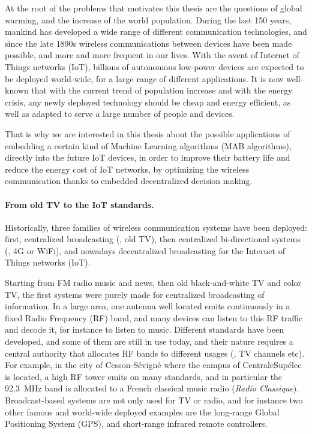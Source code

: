 %
At the root of the problems that motivates this thesis are the questions of global warming, and the increase of the world population.
During the last 150 years, mankind has developed a wide range of different communication technologies, and since the late $1890$s wireless communications between devices have been made possible, and more and more frequent in our lives.
With the avent of Internet of Things networks (IoT), billions of autonomous low-power devices are expected to be deployed world-wide, for a large range of different applications.
It is now well-known that with the current trend of population increase and with the energy crisis, any newly deployed technology should be cheap and energy efficient,
as well as adapted to serve a large number of people and devices.

That is why we are interested in this thesis about the possible applications of embedding a certain kind of Machine Learning algorithms (MAB algorithms),
directly into the future IoT devices, in order to improve their battery life and reduce the energy cost of IoT networks, by optimizing the wireless communication thanks to embedded decentralized decision making.


\paragraph{From old TV to the IoT standards.}
%
Historically, three families of wireless communication systems have been deployed: first, centralized broadcasting (\eg, old TV), then centralized bi-directional systems (\eg, 4G or WiFi), and nowadays decentralized broadcasting for the Internet of Things networks (IoT).

Starting from FM radio music and news, then old black-and-white TV and color TV, the first systems were purely made for centralized broadcasting of information. In a large area, one antenna well located emits continuously in a fixed Radio Frequency (RF) band, and many devices can listen to this RF traffic and decode it, for instance to listen to music.
Different standards have been developed, and some of them are still in use today, and their nature requires a central authority that allocates RF bands to different usages (\eg, TV channels etc).
For example, in the city of Cesson-Sévigné where the campus of CentraleSupélec is located, a high RF tower emits on many standards, and in particular the \SI{92.3}{\mega\hertz} band is allocated to a French classical music radio (\emph{Radio Classique}).
Broadcast-based systems are not only used for TV or radio,
and for instance two other famous and world-wide deployed examples are the long-range Global Positioning System (GPS), and short-range infrared remote controllers.

